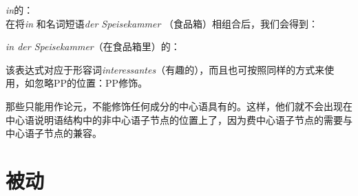\ea
\emph{in}的\catv ：\\
\z
在将\emph{in} 和名词短语\emph{der Speisekammer} （食品箱）相组合后，我们会得到：

\eas
\emph{in der Speisekammer}（在食品箱里）的\catv  ：\\
\zs

\noindent
该表达式对应于形容词\emph{interessantes}（有趣的），而且也可按照同样的方式来使用，如忽略PP的位置：PP修饰\nbar。

那些只能用作论元，不能修饰任何成分的中心语具有的\modv 。这样，他们就不会出现在中心语说明语结构中的非中心语子节点的位置上了，因为费中心语子节点的\modv 需要与中心语子节点的\synsemv 兼容。

\section{被动}
\label{Abschnitt-HPSG-Passiv}\label{sec-hpsg-passive}

